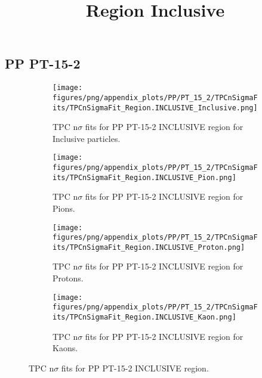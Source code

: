             \subsection{PP PT-15-2}
            \begin{figure}[H]
                \title{Region Inclusive}
                \begin{subfigure}[b]{0.5\textwidth}
                    \centering
                    \texttt{[image: figures/png/appendix\_plots/PP/PT\_15\_2/TPCnSigmaFits/TPCnSigmaFit\_Region.INCLUSIVE\_Inclusive.png]}
                    \caption{TPC n$\sigma$ fits for PP PT-15-2 INCLUSIVE region for Inclusive particles.}
                    \label{fig:appendix_PP_PT-15-2_INCLUSIVE_Inclusive}
                \end{subfigure}
                \begin{subfigure}[b]{0.5\textwidth}
                    \centering
                    \texttt{[image: figures/png/appendix\_plots/PP/PT\_15\_2/TPCnSigmaFits/TPCnSigmaFit\_Region.INCLUSIVE\_Pion.png]}
                    \caption{TPC n$\sigma$ fits for PP PT-15-2 INCLUSIVE region for Pions.}
                    \label{fig:appendix_PP_PT-15-2_INCLUSIVE_Pion}
                \end{subfigure}
                \begin{subfigure}[b]{0.5\textwidth}
                    \centering
                    \texttt{[image: figures/png/appendix\_plots/PP/PT\_15\_2/TPCnSigmaFits/TPCnSigmaFit\_Region.INCLUSIVE\_Proton.png]}
                    \caption{TPC n$\sigma$ fits for PP PT-15-2 INCLUSIVE region for Protons.}
                    \label{fig:appendix_PP_PT-15-2_INCLUSIVE_Proton}
                \end{subfigure}
                \begin{subfigure}[b]{0.5\textwidth}
                    \centering
                    \texttt{[image: figures/png/appendix\_plots/PP/PT\_15\_2/TPCnSigmaFits/TPCnSigmaFit\_Region.INCLUSIVE\_Kaon.png]}
                    \caption{TPC n$\sigma$ fits for PP PT-15-2 INCLUSIVE region for Kaons.}
                    \label{fig:appendix_PP_PT-15-2_INCLUSIVE_Kaon}
                \end{subfigure}
                \caption{TPC n$\sigma$ fits for PP PT-15-2 INCLUSIVE region.}
                \label{fig:appendix_PP_PT-15-2_INCLUSIVE}
            \end{figure}
